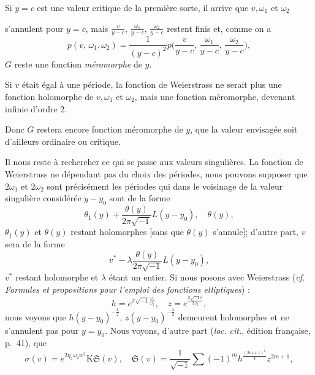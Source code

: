 \documentclass{article}
\begin{document}
Si $y = c$ est une valeur critique de la première sorte, il arrive que $v, \omega_{1}$ et $\omega_{2}$

s'annulent pour $y = c$, mais $\frac{v}{y - c}$, $\frac{\omega_{1}}{y - c}$, $\frac{\omega_{2}}{y - c}$ restent finis et, comme on a
\[
p(v,\, \omega_{1}, \omega_{2}) = \frac{1}{(y - c)^{2}} p\biggl( \frac{v}{y - c},\, \frac{\omega_{1}}{y - c},\, \frac{\omega_{2}}{y - c} \biggr),
\]
$G$ reste une fonction \emph{méromorphe} de $y$.

Si $v$ était égal à une période, la fonction de Weierstrass ne serait plus une fonction holomorphe de $v, \omega_{1}$ et $\omega_{2}$, mais une fonction méromorphe, devenant infinie d'ordre 2.

Donc $G$ restera encore fonction méromorphe de $y$, que la valeur envisagée soit d'ailleurs ordinaire ou critique.

Il nous reste à rechercher ce qui se passe aux valeurs singulières. La fonction de Weierstrass ne dépendant pas du choix des périodes, nous pouvons supposer que $2\omega_{1}$ et $2\omega_{2}$ sont précisément les périodes qui dans le voisinage de la valeur singulière considérée $y - y_{0}$ sont de la forme
\[
\theta_{1}(y) + \frac{\theta(y)}{2\pi\sqrt{-1}} L(y - y_{0}), \quad \theta(y),
\]
$\theta_{1}(y)$ et $\theta(y)$ restant holomorphes [sans que $\theta(y)$ s'annule]; d'autre part, $v$ sera de la forme
\[
v^{*} - \lambda \frac{\theta(y)}{2\pi\sqrt{-1}} L(y - y_{0}),
\]
$v^{*}$ restant holomorphe et $\lambda$ étant un entier. Si nous posons avec Weierstrass (\emph{cf. Formules et propositions pour l'emploi des fonctions elliptiques}) :
\[
h = e^{\pi\sqrt{-1} \frac{\omega_{1}}{\omega_{2}}}, \quad z = e^{\frac{\pi\sqrt{-1} v}{2\omega_{2}}},
\]
nous voyons que $h(y - y_{0})^{-\frac{1}{2}}$, $z(y - y_{0})^{-\frac{\lambda}{2}}$ demeurent holomorphes et ne s'annulent pas pour $y = y_{0}$. Nous voyons, d'autre part (\emph{loc. cit.}, édition française, p.~41), que
\[
\sigma(v) = e^{2\eta_{2} \omega_{2} w^{2}} \mathrm{K} \mathfrak{S}(v), \quad \mathfrak{S}(v) = \frac{1}{\sqrt{-1}} \sum (-1)^{m} h^{\frac{(2m+1)^{2}}{4}} z^{2m+1},
\]
\end{document}
